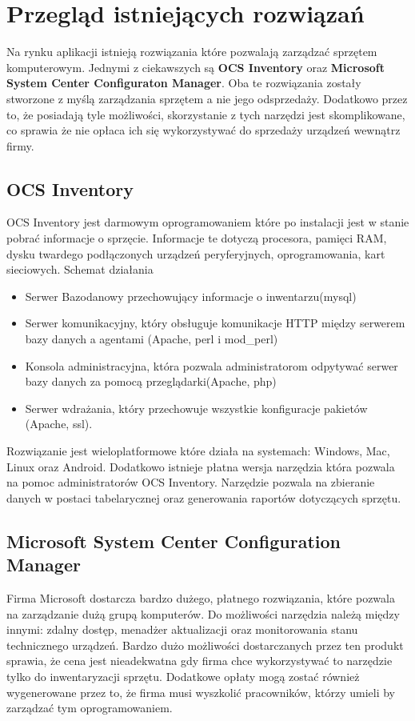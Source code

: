 \section{Przegląd istniejących rozwiązań}

Na rynku aplikacji istnieją rozwiązania które pozwalają zarządzać sprzętem komputerowym. Jednymi z ciekawszych są \textbf{OCS Inventory} oraz \textbf{Microsoft System Center Configuraton Manager}. Oba te rozwiązania zostały stworzone z myślą zarządzania sprzętem a nie jego odsprzedaży. Dodatkowo przez to, że posiadają tyle możliwości, skorzystanie z tych narzędzi jest skomplikowane, co sprawia że nie opłaca ich się wykorzystywać do sprzedaży urządzeń wewnątrz firmy. 

\subsection{OCS Inventory}
OCS Inventory jest darmowym oprogramowaniem które po instalacji jest w stanie pobrać informacje o sprzęcie. Informacje te dotyczą procesora, pamięci RAM, dysku twardego podłączonych urządzeń peryferyjnych, oprogramowania, kart sieciowych.
\newline
Schemat działania
\begin{itemize}
	\item Serwer Bazodanowy przechowujący informacje o inwentarzu(mysql)
	\item Serwer komunikacyjny, który obsługuje komunikacje HTTP między serwerem bazy danych a agentami (Apache, perl i mod\_perl)
	\item Konsola administracyjna, która pozwala administratorom odpytywać serwer bazy danych za pomocą przeglądarki(Apache, php)
	\item Serwer wdrażania, który przechowuje wszystkie konfiguracje pakietów (Apache, ssl).
\end{itemize}
Rozwiązanie jest wieloplatformowe które działa na systemach: Windows, Mac, Linux oraz Android. Dodatkowo istnieje płatna wersja narzędzia która pozwala na pomoc administratorów OCS Inventory. Narzędzie pozwala na zbieranie danych w postaci tabelarycznej oraz generowania raportów dotyczących sprzętu. 
\subsection{Microsoft System Center Configuration Manager}
Firma Microsoft dostarcza bardzo dużego, płatnego rozwiązania, które pozwala na zarządzanie dużą grupą komputerów. Do możliwości narzędzia należą między innymi: zdalny dostęp, menadżer aktualizacji oraz monitorowania stanu technicznego urządzeń. Bardzo dużo możliwości dostarczanych przez ten produkt sprawia, że cena jest nieadekwatna gdy firma chce wykorzystywać to narzędzie tylko do inwentaryzacji sprzętu. Dodatkowe opłaty mogą zostać również wygenerowane przez to, że firma musi wyszkolić pracowników, którzy umieli by zarządzać tym oprogramowaniem.

